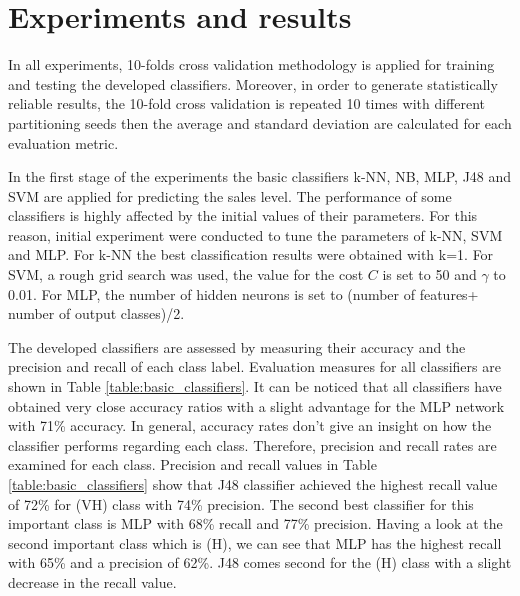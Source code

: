 \documentclass[a4paper,10pt,onecolumn,preprint,3p]{elsarticle}
\begin{document}
\section{Experiments and results}
\label{sec:experiments_results}


In all experiments, 10-folds cross validation methodology is applied for training and testing the developed classifiers. Moreover, in order to generate statistically reliable results, the 10-fold cross validation is repeated 10 times with different partitioning seeds then the average and standard deviation are calculated for each evaluation metric.

In the first stage of the experiments the basic classifiers k-NN, NB, MLP, J48 and SVM are applied for predicting the sales level. The performance of some classifiers is highly affected by the initial values of their parameters. For this reason, initial experiment were conducted to tune the parameters of k-NN, SVM and MLP. For k-NN the best classification results were obtained with k=1. For SVM, a rough grid search was used, the value for the cost $C$ is set to 50 and $\gamma$  to 0.01. For MLP, the number of hidden neurons is set to (number of features+ number of output classes)/2.


The developed classifiers are assessed by measuring their accuracy and the precision and recall of each class label. Evaluation measures for all classifiers are shown in Table \ref{table:basic_classifiers}. It can be noticed that all classifiers have obtained very close accuracy ratios with a slight advantage for the MLP network with 71\% accuracy. In general, accuracy rates don't give an insight on how the classifier performs regarding each class. Therefore, precision and recall rates are examined for each class. Precision and recall values in Table \ref{table:basic_classifiers} show that J48 classifier achieved the highest recall value of 72\% for (VH) class with 74\% precision. The second best classifier for this important class is MLP with 68\% recall and 77\% precision. Having a look at the second important class which is (H), we can see that MLP has the highest recall with 65\% and a precision of 62\%. J48 comes second for the (H) class with a slight decrease in the recall value.
\end{document}
